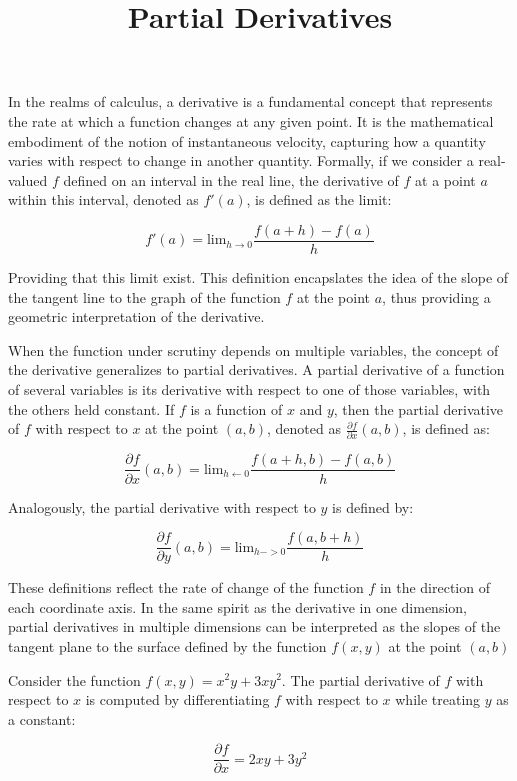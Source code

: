 \documentclass{article}
\title{Partial Derivatives}
\begin{document}
\maketitle
\clearpage

In the realms of calculus, a derivative is a fundamental concept that represents the rate at which a function
changes at any given point. It is the mathematical embodiment of the notion of instantaneous velocity,
capturing how a quantity varies with respect to change in another quantity. Formally, if we consider a 
real-valued $f$ defined on an interval in the real line, the derivative of $f$ at a point $a$ within this
interval, denoted as $f'(a)$, is defined as the limit:

$$
f'(a)=\text{lim}_{h\rightarrow 0}\frac{f(a+h)-f(a)}{h}
$$

Providing that this limit exist. This definition encapslates the idea of the slope of the tangent line to
the graph of the function $f$ at the point $a$, thus providing a geometric interpretation of the 
derivative.

When the function under scrutiny depends on multiple variables, the concept of the derivative generalizes
to partial derivatives. A partial derivative of a function of several variables is its derivative with
respect to one of those variables, with the others held constant. If $f$ is a function of $x$ and $y$, then 
the partial derivative of $f$ with respect to $x$ at the point $(a,b)$, denoted as 
$\frac{\partial f}{\partial x}(a,b)$, is defined as:

$$
\frac{\partial f}{\partial x}(a, b) = \text{lim}_{h \leftarrow 0} \frac{f(a+h,b)-f(a,b)}{h}
$$

Analogously, the partial derivative with respect to $y$ is defined by:

$$
\frac{\partial f}{\partial y}(a, b) = \text{lim}_{h->0}\frac{f(a, b+h)}{h}
$$

These definitions reflect the rate of change of the function $f$ in the direction of each coordinate
axis. In the same spirit as the derivative in one dimension, partial derivatives in multiple
dimensions can be interpreted as the slopes of the tangent plane to the surface defined by the function
$f(x,y)$ at the point $(a,b)$

Consider the function $f(x,y)=x^2y+3xy^2$. The partial derivative of $f$ with respect to $x$ is computed
by differentiating $f$ with respect to $x$ while treating $y$ as a constant:

$$
\frac{\partial f}{\partial x} = 2xy + 3y^2
$$
\end{document}
